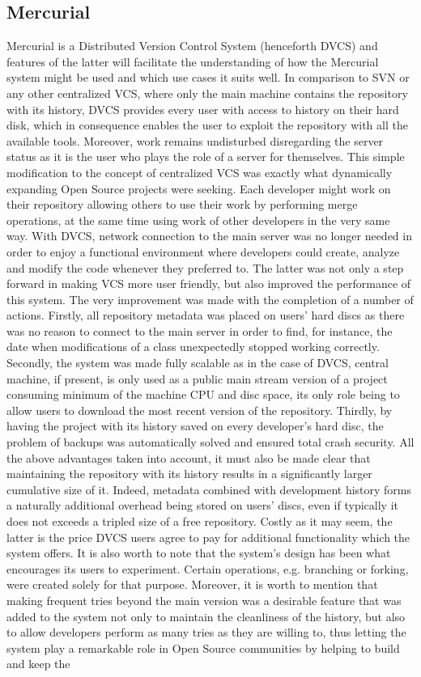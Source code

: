 \subsection{Mercurial}\label{subsec:hg}
Mercurial is a Distributed Version Control System (henceforth DVCS) and features of the latter will facilitate the understanding of how the Mercurial system might be used and which use cases it suits well. In comparison to SVN or any other centralized VCS, where only the main machine contains the repository with its history, DVCS provides every user with access to history on their hard disk, which in consequence enables the user to exploit the repository with all the available tools. Moreover, work remains undisturbed disregarding the server status as it is the user who plays the role of a server for themselves. This simple modification to the concept of centralized VCS was exactly what dynamically expanding Open Source projects were seeking. Each developer might work on their repository allowing others to use their work by performing merge operations, at the same time using work of other developers in the very same way. With DVCS, network connection to the main server was no longer needed in order to enjoy a functional environment where developers could create, analyze and modify the code whenever they preferred to. The latter was not only a step forward in making VCS more user friendly, but also improved the performance of this system. The very improvement was made with the completion of a number of actions. Firstly, all repository metadata was placed on users' hard discs as there was no reason to connect to the main server in order to find, for instance, the date when modifications of a class unexpectedly stopped working correctly. Secondly, the system was made fully scalable as in the case of DVCS, central machine, if present, is only used as a public main stream version of a project consuming minimum of the machine CPU and disc space, its only role being to allow users to download the most recent version of the repository. Thirdly, by having the project with its history saved on every developer's hard disc, the problem of backups was automatically solved and ensured total crash security. All the above advantages taken into account, it must also be made clear that  maintaining the repository with its history results in a significantly larger cumulative size of it. Indeed, metadata combined with development history forms a naturally additional overhead being stored on users' discs, even if typically it does not exceeds a tripled size of a free repository. Costly as it may seem, the latter is the price DVCS users agree to pay for additional functionality which the  system offers. It is also worth to note that the system's design has been what encourages its users to experiment. Certain operations, e.g. branching or forking, were created solely for that purpose. Moreover, it is worth to mention that making frequent tries beyond the main version was a desirable feature that was added to the system not only to maintain the cleanliness of the history, but also to allow developers perform as many tries as they are willing to, thus letting the system play a remarkable role in Open Source communities by helping to build and keep the 